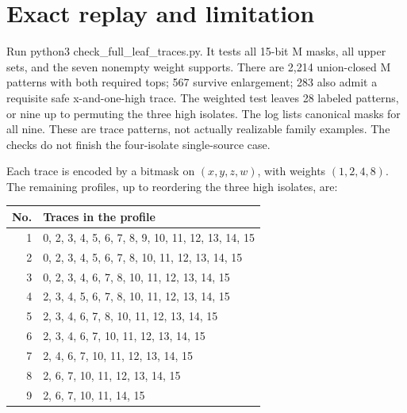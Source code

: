 \documentclass[11pt,letterpaper]{article}
\begin{document}
\section{Exact replay and
limitation}\label{exact-replay-and-limitation}

Run python3 check\_full\_leaf\_traces.py. It tests all 15-bit M masks,
all upper sets, and the seven nonempty weight supports. There are 2,214
union-closed M patterns with both required tops; 567 survive
enlargement; 283 also admit a requisite safe x-and-one-high trace. The
weighted test leaves 28 labeled patterns, or nine up to permuting the
three high isolates. The log lists canonical masks for all nine. These
are trace patterns, not actually realizable family examples. The checks
do not finish the four-isolate single-source case.

Each trace is encoded by a bitmask on \((x,y,z,w)\), with weights \((1,2,4,8)\).
The remaining profiles, up to reordering the three high isolates, are:
\begin{center}
\small
\begin{tabular}{r l}
\textbf{No.}&\textbf{Traces in the profile}\\\hline
1&0, 2, 3, 4, 5, 6, 7, 8, 9, 10, 11, 12, 13, 14, 15\\
2&0, 2, 3, 4, 5, 6, 7, 8, 10, 11, 12, 13, 14, 15\\
3&0, 2, 3, 4, 6, 7, 8, 10, 11, 12, 13, 14, 15\\
4&2, 3, 4, 5, 6, 7, 8, 10, 11, 12, 13, 14, 15\\
5&2, 3, 4, 6, 7, 8, 10, 11, 12, 13, 14, 15\\
6&2, 3, 4, 6, 7, 10, 11, 12, 13, 14, 15\\
7&2, 4, 6, 7, 10, 11, 12, 13, 14, 15\\
8&2, 6, 7, 10, 11, 12, 13, 14, 15\\
9&2, 6, 7, 10, 11, 14, 15\\
\end{tabular}
\end{center}
\end{document}
